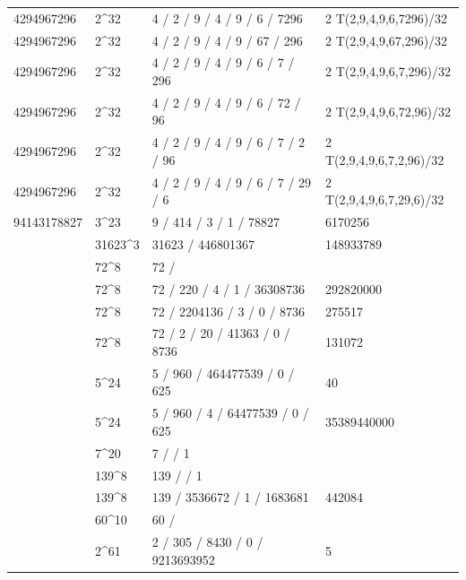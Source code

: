 \documentclass[11pt,a4paper]{article}
\begin{document}
\begin{longtable}{@{}P{\dimexpr(\tabcolsep)/4\relax}P{\dimexpr(\tabcolsep)/4\relax}P{\dimexpr(\tabcolsep)/4\relax}P{\dimexpr(\tabcolsep)/4\relax}@{}}
4294967296 & 2\textasciicircum{}32 & 4 / 2 / 9 / 4 / 9 / 6 / 7296 & 2 T(2,9,4,9,6,7296)/32 \\
4294967296 & 2\textasciicircum{}32 & 4 / 2 / 9 / 4 / 9 / 67 / 296 & 2 T(2,9,4,9,67,296)/32 \\
4294967296 & 2\textasciicircum{}32 & 4 / 2 / 9 / 4 / 9 / 6 / 7 / 296 & 2 T(2,9,4,9,6,7,296)/32 \\
4294967296 & 2\textasciicircum{}32 & 4 / 2 / 9 / 4 / 9 / 6 / 72 / 96 & 2 T(2,9,4,9,6,72,96)/32 \\
4294967296 & 2\textasciicircum{}32 & 4 / 2 / 9 / 4 / 9 / 6 / 7 / 2 / 96 & 2 T(2,9,4,9,6,7,2,96)/32 \\
4294967296 & 2\textasciicircum{}32 & 4 / 2 / 9 / 4 / 9 / 6 / 7 / 29 / 6 & 2 T(2,9,4,9,6,7,29,6)/32 \\
94143178827 & 3\textasciicircum{}23 & 9 / 414 / 3 / 1 / 78827 & 6170256 \\
 & 31623\textasciicircum{}3 & 31623 / 446801367 & 148933789 \\
 & 72\textasciicircum{}8 & 72 /  &  \\
 & 72\textasciicircum{}8 & 72 / 220 / 4 / 1 / 36308736 & 292820000 \\
 & 72\textasciicircum{}8 & 72 / 2204136 / 3 / 0 / 8736 & 275517 \\
 & 72\textasciicircum{}8 & 72 / 2 / 20 / 41363 / 0 / 8736 & 131072 \\
 & 5\textasciicircum{}24 & 5 / 960 / 464477539 / 0 / 625 & 40 \\
 & 5\textasciicircum{}24 & 5 / 960 / 4 / 64477539 / 0 / 625 & 35389440000 \\
 & 7\textasciicircum{}20 & 7 /  / 1 &  \\
 & 139\textasciicircum{}8 & 139 /  / 1 &  \\
 & 139\textasciicircum{}8 & 139 / 3536672 / 1 / 1683681 & 442084 \\
 & 60\textasciicircum{}10 & 60 /  &  \\
 & 2\textasciicircum{}61 & 2 / 305 / 8430 / 0 / 9213693952 & 5 \\

\end{longtable}
\end{document}
